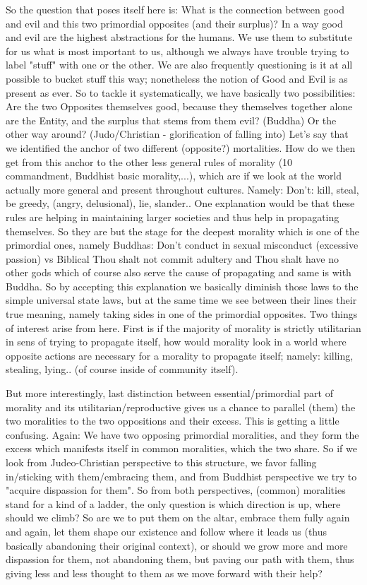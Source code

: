 \documentclass[10pt]{book}
\begin{document}
So the question that poses itself here is: What is the connection between good and evil and this two primordial opposites (and their surplus)?
In a way good and evil are the highest abstractions for the humans. We use them to substitute for us what is most important to us, although we always have trouble trying to label "stuff" with one or the other. We are also frequently questioning is it at all possible to bucket stuff this way; nonetheless the notion of Good and Evil is as present as ever. 
So to tackle it systematically, we have basically two possibilities: Are the two Opposites themselves good, because they themselves together alone are the Entity, and the surplus that stems from them evil? (Buddha) Or the other way around? (Judo/Christian - glorification of falling into)
Let's say that we identified the anchor of two different (opposite?) mortalities. How do we then get from this anchor to the other less general rules of morality (10 commandment, Buddhist basic morality,...), which are if we look at the world actually more general and present throughout cultures. Namely: Don't: kill, steal, be greedy, (angry, delusional), lie, slander.. One explanation would be that these rules are helping in maintaining larger societies and thus help in propagating themselves. So they are but the stage for the deepest morality which is one of the primordial ones, namely Buddhas: Don't conduct in sexual misconduct (excessive passion) vs Biblical Thou shalt not commit adultery and Thou shalt have no other gods which of course also serve the cause of propagating and same is with Buddha.
So by accepting this explanation we basically diminish those laws to the simple universal state laws, but at the same time we see between their lines their true meaning, namely taking sides in one of the primordial opposites. Two things of interest arise from here. First is if the majority of morality is strictly utilitarian in sens of trying to propagate itself, how would morality look in a world where opposite actions are necessary for a morality to propagate itself; namely: killing, stealing, lying.. (of course inside of community itself).  

But more interestingly, last distinction between essential/primordial part of morality and its utilitarian/reproductive gives us a chance to parallel (them) the two moralities to the two oppositions and their excess. This is getting a little confusing. Again: We have two opposing primordial moralities, and they form the excess which manifests itself in common moralities, which the two share. So if we look from Judeo-Christian perspective to this structure, we favor falling in/sticking with them/embracing them, and from Buddhist perspective we try to "acquire dispassion for them". So from both perspectives, (common) moralities stand for a kind of a ladder, the only question is which direction is up, where should we climb? So are we to put them on the altar, embrace them fully again and again, let them shape our existence and follow where it leads us (thus basically abandoning their original context), or should we grow more and more dispassion for them, not abandoning them, but paving our path with them, thus giving less and less thought to them as we move forward with their help?   
\end{document}
